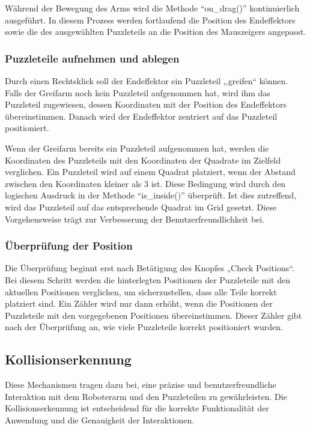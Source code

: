 \documentclass[12pt]{article}
\begin{document}
    Während der Bewegung des Arms wird die Methode “on\_drag()” kontinuierlich ausgeführt. In diesem
    Prozess werden fortlaufend die Position des Endeffektors sowie die des ausgewählten Puzzleteils an
    die Position des Mauszeigers angepasst.

    \subsubsection{Puzzleteile aufnehmen und ablegen}
    Durch einen Rechtsklick soll der Endeffektor ein Puzzleteil „greifen“ können. Falls der Greifarm noch
    kein Puzzleteil aufgenommen hat, wird ihm das Puzzleteil zugewiesen, dessen Koordinaten mit der
    Position des Endeffektors übereinstimmen. Danach wird der Endeffektor zentriert auf das Puzzleteil
    positioniert.

    Wenn der Greifarm bereits ein Puzzleteil aufgenommen hat, werden die Koordinaten des Puzzleteils mit
    den Koordinaten der Quadrate im Zielfeld verglichen. Ein Puzzleteil wird auf einem Quadrat platziert,
    wenn der Abstand zwischen den Koordinaten kleiner als 3 ist. Diese Bedingung wird durch den logischen
    Ausdruck in der Methode “is\_inside()” überprüft. Ist dies zutreffend, wird das Puzzleteil auf das
    entsprechende Quadrat im Grid gesetzt. Diese Vorgehensweise trägt zur Verbesserung der
    Benutzerfreundlichkeit bei.

    \subsubsection{Überprüfung der Position}
    Die Überprüfung beginnt erst nach Betätigung des Knopfes „Check Positions“. Bei diesem Schritt
    werden die hinterlegten Positionen der Puzzleteile mit den aktuellen Positionen verglichen, um
    sicherzustellen, dass alle Teile korrekt platziert sind. Ein Zähler wird nur dann erhöht, wenn die
    Positionen der Puzzleteile mit den vorgegebenen Positionen übereinstimmen. Dieser Zähler gibt nach
    der Überprüfung an, wie viele Puzzleteile korrekt positioniert wurden.

    \subsection{Kollisionserkennung}
    Diese Mechanismen tragen dazu bei, eine präzise und benutzerfreundliche Interaktion mit dem
    Roboterarm und den Puzzleteilen zu gewährleisten. Die Kollisionserkennung ist entscheidend für
    die korrekte Funktionalität der Anwendung und die Genauigkeit der Interaktionen.
\end{document}
